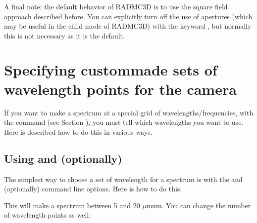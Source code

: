 \documentclass[letterpaper,10pt,english]{sphinxmanual}
\begin{document}
A final note: the default behavior of RADMC\sphinxhyphen{}3D is to use the square field
approach described before. You can explicitly turn off the use of apertures
(which may be useful in the child mode of RADMC\sphinxhyphen{}3D) with the keyword
, but normally this is not necessary as it is the default.


\section{Specifying custom\sphinxhyphen{}made sets of wavelength points for the camera}
\label{\detokenize{imagesspectra:specifying-custom-made-sets-of-wavelength-points-for-the-camera}}\label{\detokenize{imagesspectra:sec-set-camera-frequencies}}
If you want to make a spectrum at a special grid of wavelengths/frequencies,
with the  command (see Section {\hyperref[\detokenize{imagesspectra:sec-making-spectra}]{}}), you must
tell  which wavelengths you want to use. Here is described how to do
this in various ways.


\subsection{Using  and (optionally) }
\label{\detokenize{imagesspectra:using-lambdarange-and-optionally-nlam}}
The simplest way to choose a set of wavelength for a spectrum is with the
 and (optionally)  command line options. Here is how to
do this:

\begin{sphinxVerbatim}[commandchars=\\\{\}]
        
\end{sphinxVerbatim}

This will make a spectrum between 5 and 20 \(\mu\)mu\textasciigrave{}m. You
can change the number of wavelength points as well:

\begin{sphinxVerbatim}[commandchars=\\\{\}]
          
\end{sphinxVerbatim}
\end{document}
